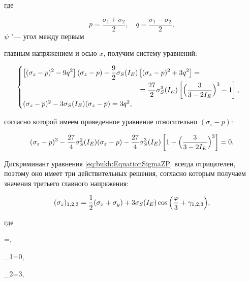 где 

$$p=\dfrac{\sigma_1+\sigma_2}{2}, \quad q=\dfrac{\sigma_1-\sigma_2}{2},$$ $\psi$ "--- угол между первым

главным  напряжением и осью $x$, получим систему уравнений:

\begin{equation*}

\begin{cases}

\begin{split}

\left[(\sigma_z-p)^2-9q^2\right](\sigma_z-p)-\frac{9}{2}\sigma_S(I_E)&\left[(\sigma_z-p)^2+3q^2\right]= {}\\

& {} = \frac{27}{2}\sigma_S^3(I_E)\left[\Bigl(\frac{3}{3-2I_E}\Bigr)^3-1\right],\end{split}\\

(\sigma_z-p)^2-3\sigma_S(I_E)(\sigma_z-p)=3q^2,

\end{cases}\end{equation*}

согласно которой имеем приведенное уравнение относительно $(\sigma_z-p)$:

\begin{equation}\label{eq:bukh:EquationSigmaZP}

(\sigma_z-p)^3-\frac{27}{4}\sigma_S^2(I_E)(\sigma_z-p)-\frac{27}{4}\sigma_S^3(I_E)\left[1-\Bigl(\frac{3}{3-2I_E}\Bigr)^3\right]=0.

\end{equation}

Дискриминант уравнения \eqref{eq:bukh:EquationSigmaZP} всегда отрицателен, поэтому оно имеет три действительных решения, согласно которым получаем значения третьего главного напряжения:

\begin{equation}\label{eq:bukh:SigmaZ}

    (\sigma_z)_{1,2,3}=\frac{1}{2}(\sigma_x+\sigma_y)+3\sigma_S(I_E)\cos{\Bigl(\frac{\varphi}3+\gamma_{1,2,3}\Bigr)},

\end{equation}

где

$$\displaystyle\varphi=\arccos{},

\quad \gamma_1=0,

\quad \gamma_2=\dfrac{2\pi}3,

